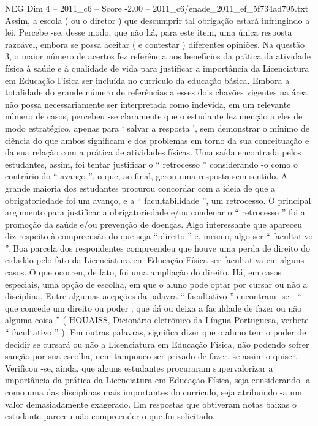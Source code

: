 \begin{textsample}{NEG Dim 4 – 2011\_c6 – Score -2.00 – 2011\_c6/enade\_2011\_ef\_5f734ad795.txt}
Assim, a escola ( ou o diretor ) que descumprir tal obrigação estará infringindo a lei.
Percebe -se, desse modo, que não há, para este item, uma única resposta razoável, embora se possa aceitar ( e contestar ) diferentes opiniões.
Na questão 3, o maior número de acertos fez referência aos benefícios da prática da atividade física à saúde e à qualidade de vida para justificar a importância da Licenciatura em Educação Física ser incluída no currículo da educação básica.
Embora a totalidade do grande número de referências a esses dois chavões vigentes na área não possa necessariamente ser interpretada como indevida, em um relevante número de casos, percebeu -se claramente que o estudante fez menção a eles de modo estratégico, apenas para ‘ salvar a resposta ’, sem demonstrar o mínimo de ciência do que ambos significam e dos problemas em torno da sua conceituação e da sua relação com a prática de atividades físicas.
Uma saída encontrada pelos estudantes, assim, foi tentar justificar o “ retrocesso ” considerando -o como o contrário do “ avanço ”, o que, ao final, gerou uma resposta sem sentido.
A grande maioria dos estudantes procurou concordar com a ideia de que a obrigatoriedade foi um avanço, e a “ facultabilidade ”, um retrocesso.
O principal argumento para justificar a obrigatoriedade e/ou condenar o “ retrocesso ” foi a promoção da saúde e/ou prevenção de doenças.
Algo interessante que apareceu diz respeito à compreensão do que seja “ direito ” e, mesmo, algo ser “ facultativo ”.
Boa parcela dos respondentes compreendeu que houve uma perda de direito do cidadão pelo fato da Licenciatura em Educação Física ser facultativa em alguns casos.
O que ocorreu, de fato, foi uma ampliação do direito.
Há, em casos especiais, uma opção de escolha, em que o aluno pode optar por cursar ou não a disciplina.
Entre algumas acepções da palavra “ facultativo ” encontram -se : “ que concede um direito ou poder ; que dá ou deixa a faculdade de fazer ou não alguma coisa ” ( HOUAISS, Dicionário eletrônico da Língua Portuguesa, verbete “ facultativo ” ).
Em outras palavras, significa dizer que o aluno tem o poder de decidir se cursará ou não a Licenciatura em Educação Física, não podendo sofrer sanção por sua escolha, nem tampouco ser privado de fazer, se assim o quiser.
Verificou -se, ainda, que alguns estudantes procuraram supervalorizar a importância da prática da Licenciatura em Educação Física, seja considerando -a como uma das disciplinas mais importantes do currículo, seja atribuindo -a um valor demasiadamente exagerado.
Em respostas que obtiveram notas baixas o estudante pareceu não compreender o que foi solicitado.

\end{textsample}
